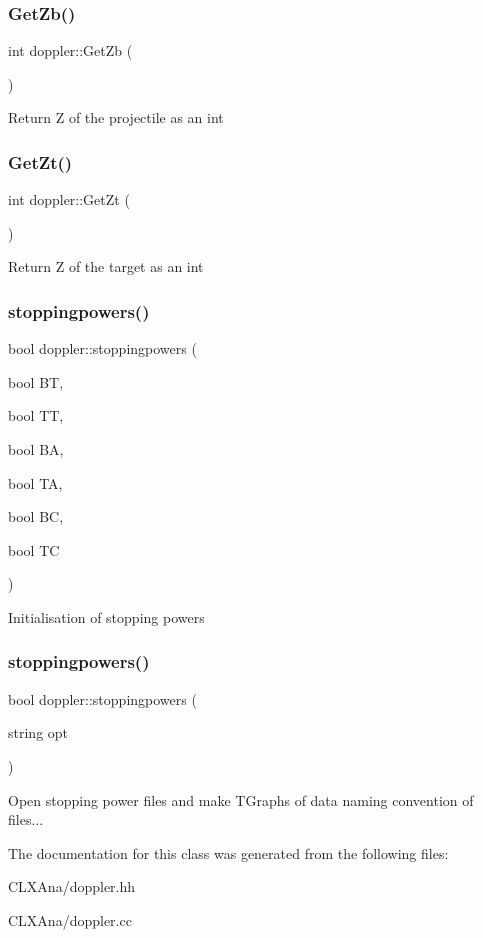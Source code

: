 \subsubsection{\texorpdfstring{Get\+Zb()}{GetZb()}}
{\footnotesize\ttfamily int doppler\+::\+Get\+Zb (\begin{DoxyParamCaption}{ }\end{DoxyParamCaption})}

Return Z of the projectile as an int \mbox{\label{classdoppler_ac0587ca2b963edec86d17dd6dac024ce}} 
\subsubsection{\texorpdfstring{Get\+Zt()}{GetZt()}}
{\footnotesize\ttfamily int doppler\+::\+Get\+Zt (\begin{DoxyParamCaption}{ }\end{DoxyParamCaption})}

Return Z of the target as an int \mbox{\label{classdoppler_ad91321c9c9220fff724e5e0982e1a8b8}} 
\subsubsection{\texorpdfstring{stoppingpowers()}{stoppingpowers()}\hspace{0.1cm}{\footnotesize\ttfamily [1/2]}}
{\footnotesize\ttfamily bool doppler\+::stoppingpowers (\begin{DoxyParamCaption}\item[{bool}]{BT,  }\item[{bool}]{TT,  }\item[{bool}]{BA,  }\item[{bool}]{TA,  }\item[{bool}]{BC,  }\item[{bool}]{TC }\end{DoxyParamCaption})}

Initialisation of stopping powers \mbox{\label{classdoppler_a4be762591578e28f8e9d646475ca943a}} 
\subsubsection{\texorpdfstring{stoppingpowers()}{stoppingpowers()}\hspace{0.1cm}{\footnotesize\ttfamily [2/2]}}
{\footnotesize\ttfamily bool doppler\+::stoppingpowers (\begin{DoxyParamCaption}\item[{string}]{opt }\end{DoxyParamCaption})}

Open stopping power files and make T\+Graphs of data naming convention of files... 

The documentation for this class was generated from the following files\+:\begin{DoxyCompactItemize}
\item 
C\+L\+X\+Ana/doppler.\+hh\item 
C\+L\+X\+Ana/doppler.\+cc\end{DoxyCompactItemize}

